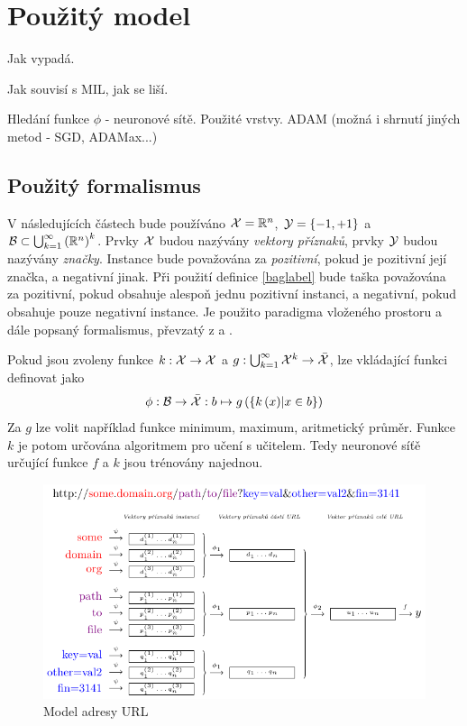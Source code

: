 \chapter{Použitý model}\label{model}

Jak vypadá.

Jak souvisí s MIL, jak se liší.

Hledání funkce \( \phi \) - neuronové sítě. Použité vrstvy. ADAM (možná i shrnutí jiných metod - SGD, ADAMax...)

\section{Použitý formalismus}\label{used_formalism}
V následujících částech bude používáno \( \mathcal X = \mathbb R^n \), \( \mathcal Y = \left\{ -1, +1 \right\} \) a \( \mathcal B \subset \bigcup_{k = 1}^{\infty} \left( \mathbb R^n \right) ^k \). Prvky \( \mathcal X \) budou nazývány \textit{vektory příznaků}, prvky \( \mathcal Y \) budou nazývány \textit{značky}. Instance bude považována za \textit{pozitivní}, pokud je pozitivní její značka, a negativní jinak. Při použití definice \ref{baglabel} bude taška považována za pozitivní, pokud obsahuje alespoň jednu pozitivní instanci, a negativní, pokud obsahuje pouze negativní instance. Je použito paradigma vloženého prostoru a dále popsaný formalismus, převzatý z \cite{pevny_using_2016} a \cite{pevny_discriminative_2016}.

Pokud jsou zvoleny funkce \( k : \mathcal X \to \mathcal X \) a \( g : \bigcup_{k = 1}^{\infty} \mathcal X^k \to \bar{\mathcal X} \), lze vkládající funkci definovat jako
\begin{equation}\label{net_pooling}
	\phi : \mathcal B \to \bar{\mathcal X} : b \mapsto g \left( \left\{ k \left( x \right) \middle| x \in b \right\} \right)
\end{equation}
Za \( g \) lze volit například funkce minimum, maximum, aritmetický průměr. Funkce \( k \) je potom určována algoritmem pro učení s učitelem. Tedy neuronové síťě určující funkce \( f \) a \( k \) jsou trénovány najednou.

\begin{figure}
	\caption{Model adresy URL}\label{url_model}
	\centering
	\includegraphics{images/model/model.pdf}
\end{figure}

